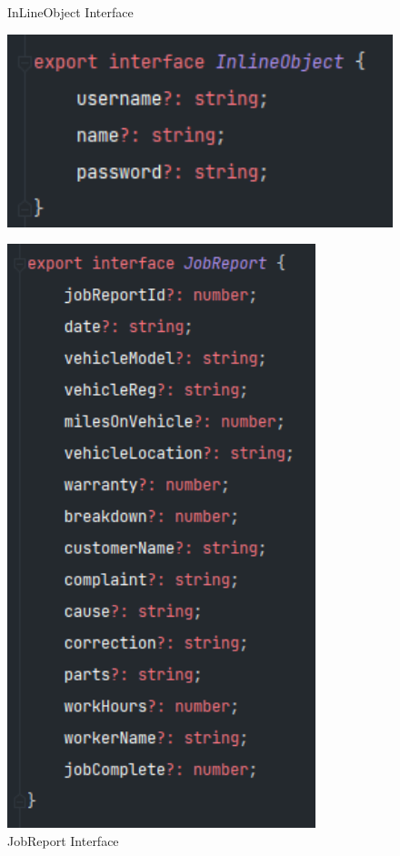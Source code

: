 \begin{figure}[H]
\centering
\begin{minipage}[b]{0.45\linewidth}
    \centering
    \caption{InLineObject Interface}
    \label{image:iloInterface}
    \includegraphics[width=1.0\textwidth]{images/repota/models/inlineobject_model.png}
\end{minipage}
\quad
\begin{minipage}[b]{0.45\linewidth}
    \centering
    \caption{JobReport Interface}
    \label{image:jrInterface}
    \includegraphics[width=0.8\textwidth]{images/repota/models/report_model.png}
\end{minipage}
\end{figure}

